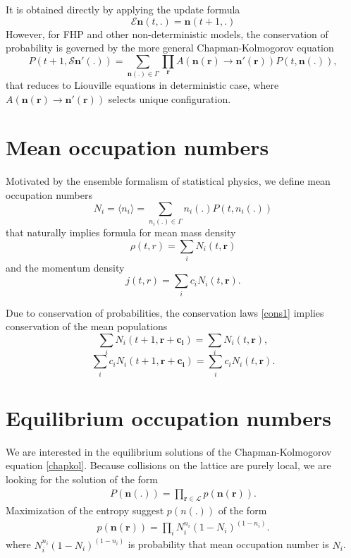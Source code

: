 It is obtained directly by applying the update formula
\begin{equation*}
\mathcal{E} \bm{n}(t,.) = \bm{n}(t+1,.)
\end{equation*}
However, for FHP and other non-deterministic models, the conservation of probability is governed by the more general Chapman-Kolmogorov equation
\begin{equation} \label{chapkol}
P(t+1,\mathcal{S} \bm{n'}(.)) = \sum_{\bm{n}(.) \in \Gamma} \prod_{\bm{r}} A(\bm{n}(\bm{r}) \rightarrow \bm{n'}(\bm{r})) P(t, \bm{n}(.)),
\end{equation}
that reduces to Liouville equations in deterministic case, where $A(\bm{n(r)} \rightarrow \bm{n'(r)})$ selects unique configuration.

\section{Mean occupation numbers}
Motivated by the ensemble formalism of statistical physics, we define mean occupation numbers
\begin{equation*}
N_i = \langle n_i \rangle = \sum_{n_i(.) \in \Gamma} n_i(.) P(t,n_i(.))
\end{equation*}
that naturally implies formula for mean mass density
\begin{equation} \label{ddens}
\rho(t,r) = \sum_i N_i(t,\bm{r})
\end{equation}
and the momentum density
\begin{equation} \label{mmom}
j(t,r) = \sum_i c_i N_i(t,\bm{r}).
\end{equation}

Due to conservation of probabilities, the conservation laws \ref{cons1} implies conservation of the mean populations
\begin{equation} \label{macro1}
\sum_i N_i(t+1,\bm{r+c_i}) = \sum_i N_i(t,\bm{r}), 
\end{equation}
\begin{equation} \label{macro2}
\sum_i c_i N_i(t+1,\bm{r+c_i}) = \sum_i c_i N_i(t,\bm{r}).
\end{equation}

\section{Equilibrium occupation numbers}
We are interested in the equilibrium solutions of the Chapman-Kolmogorov equation \ref{chapkol}. Because collisions on the lattice are purely local, we are looking for the solution of the form
\begin{align} \label{formula1}
P(\bm{n}(.)) = \prod_{\bm{r} \in \mathcal{L}} p(\bm{n}(\bm{r})).
\end{align}
Maximization of the entropy suggest $p(n(.))$ of the form
\begin{align} \label{formula2}
p(\bm{n}(\bm{r})) = \prod_i N_i^{n_i} (1 - N_i)^{(1-n_i)}.
\end{align}
where $N_i^{n_i} (1 - N_i)^{(1-n_i)}$ is probability that mean occupation number is $N_i$.

